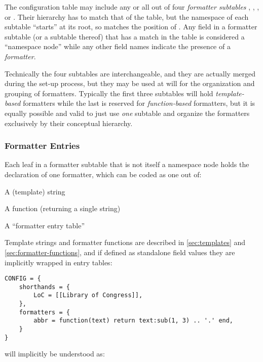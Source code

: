 \documentclass{scrartcl}
\begin{document}
The configuration table may include any or all out of four \emph{formatter
subtables} , , , or
.  Their hierarchy has to match that of
the  table, but the namespace of each subtable “starts” at its
root, so  matches the position
of .  Any field in a formatter
subtable (or a subtable thereof) that has a match in the 
table is considered a “namespace node” while any other field names indicate the
presence of a \emph{formatter}.

Technically the four subtables are interchangeable, and they are actually merged
during the set-up process, but they may be used at will for the organization and
grouping of formatters.   Typically the first three subtables will hold
\emph{template-based} formatters while the last is reserved for
\emph{function-based} formatters, but it is equally possible and valid to just
use \emph{one} subtable and organize the formatters exclusively by their
conceptual hierarchy.


\subsubsection{Formatter Entries}
\label{sec:formatter-entries}

Each leaf in a formatter subtable that is not itself a namespace node holds the declaration of one formatter, which can be coded as one out of:

\begin{itemize*}
\item A (template) string
\item A function (returning a single string)
\item A “formatter entry table”
\end{itemize*}

Template strings and formatter functions are described in \vref{sec:templates}
and \vref{sec:formatter-functions}, and if defined as standalone field values
they are implicitly wrapped in entry tables:

\begin{verbatim}
CONFIG = {
    shorthands = {
        LoC = [[Library of Congress]],
    },
    formatters = {
        abbr = function(text) return text:sub(1, 3) .. '.' end,
    }
}
\end{verbatim}

\noindent will implicitly be understood as:
\end{document}
